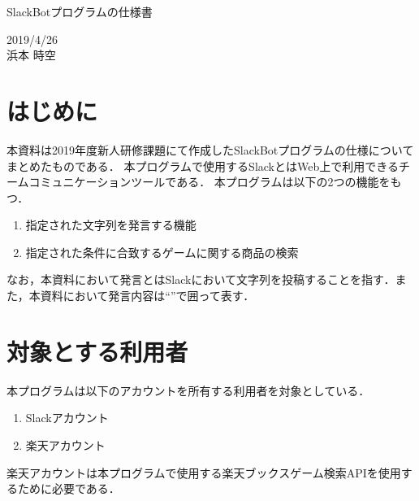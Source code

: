 \documentclass[12pt]{jsarticle}
\begin{document}
\begin{center}
{\LARGE SlackBotプログラムの仕様書}
\end{center}

\begin{flushright}
  2019/4/26\\
  浜本 時空
\end{flushright}
\section{はじめに}
\label{sec:introduction}
本資料は2019年度新人研修課題にて作成したSlackBotプログラムの仕様についてまとめたものである．
本プログラムで使用するSlack\cite{slack}とはWeb上で利用できるチームコミュニケーションツールである．
本プログラムは以下の2つの機能をもつ．
\begin{enumerate}
  \item 指定された文字列を発言する機能
  \item 指定された条件に合致するゲームに関する商品の検索
\end{enumerate}
なお，本資料において発言とはSlackにおいて文字列を投稿することを指す．また，本資料において発言内容は``''で囲って表す．

\section{対象とする利用者}
本プログラムは以下のアカウントを所有する利用者を対象としている．
\begin{enumerate}
  \item Slackアカウント
  \item 楽天\cite{rakuten}アカウント
\end{enumerate}
楽天アカウントは本プログラムで使用する楽天ブックスゲーム検索APIを使用するために必要である．
\end{document}
